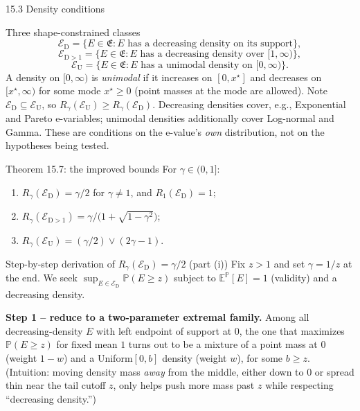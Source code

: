 \documentclass[aspectratio=169,10pt]{beamer}
\newcommand{\PP}{\mathbb{P}}
\newcommand{\EE}{\mathbb{E}}
\newcommand{\frakE}{\mathfrak{E}}
\newcommand{\ED}{\mathcal{E}_{\mathrm{D}}}
\newcommand{\EDone}{\mathcal{E}_{\mathrm{D}>1}}
\newcommand{\EU}{\mathcal{E}_{\mathrm{U}}}
\begin{document}
\begin{frame}[allowframebreaks]{15.3 Density conditions}
  \begin{block}{Three shape-constrained classes}
    \[
      \ED = \{E\in\frakE : E \text{ has a decreasing density on its support}\},
    \]
    \[
      \EDone = \{E\in\frakE : E \text{ has a decreasing density over } [1,\infty)\},
    \]
    \[
      \EU = \{E\in\frakE : E \text{ has a unimodal density on } [0,\infty)\}.
    \]
    A density on $[0,\infty)$ is \emph{unimodal} if it increases on $[0,x^\star]$ and decreases on $[x^\star,\infty)$ for some mode $x^\star\ge0$ (point masses at the mode are allowed). Note $\ED\subseteq\EU$, so $R_\gamma(\EU)\ge R_\gamma(\ED)$. Decreasing densities cover, e.g., Exponential and Pareto e-variables; unimodal densities additionally cover Log-normal and Gamma. These are conditions on the e-value's \emph{own} distribution, not on the hypotheses being tested.
  \end{block}

  \begin{block}{Theorem 15.7: the improved bounds}
    For $\gamma\in(0,1]$:
    \begin{enumerate}
      \item[(i)] $R_\gamma(\ED)=\gamma/2$ for $\gamma\ne1$, and $R_1(\ED)=1$;
      \item[(ii)] $R_\gamma(\EDone) = \gamma\big/\big(1+\sqrt{1-\gamma^2}\big)$;
      \item[(iii)] $R_\gamma(\EU) = (\gamma/2)\vee(2\gamma-1)$.
    \end{enumerate}
  \end{block}

  \framebreak

  \begin{block}{Step-by-step derivation of $R_\gamma(\ED)=\gamma/2$ (part (i))}
    Fix $z>1$ and set $\gamma=1/z$ at the end. We seek $\sup_{E\in\ED}\PP(E\ge z)$ subject to $\EE^\PP[E]=1$ (validity) and a decreasing density.

    \textbf{Step 1 -- reduce to a two-parameter extremal family.} Among all decreasing-density $E$ with left endpoint of support at $0$, the one that maximizes $\PP(E\ge z)$ for fixed mean $1$ turns out to be a mixture of a point mass at $0$ (weight $1-w$) and a Uniform$[0,b]$ density (weight $w$), for some $b\ge z$. (Intuition: moving density mass \emph{away} from the middle, either down to $0$ or spread thin near the tail cutoff $z$, only helps push more mass past $z$ while respecting ``decreasing density.'')


\end{block}
\end{frame}
\end{document}
